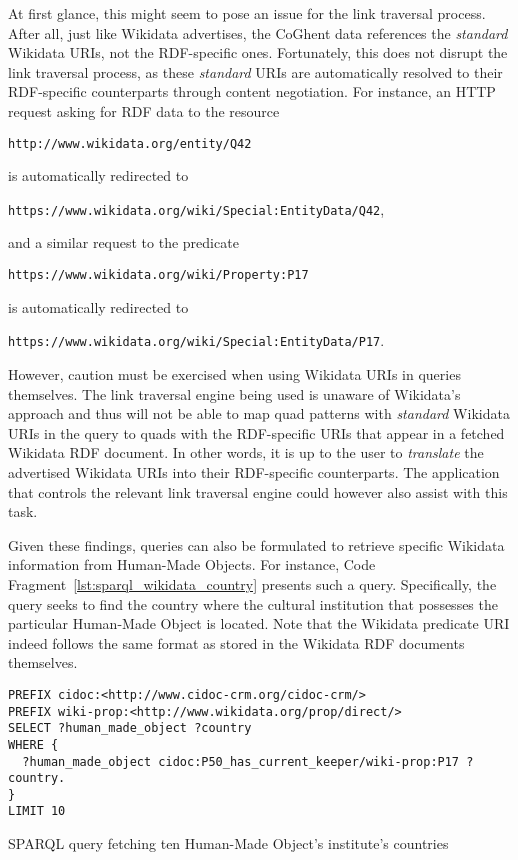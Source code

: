 At first glance, this might seem to pose an issue for the link traversal process. After all, just like Wikidata advertises, the CoGhent data references the \textit{standard} Wikidata URIs, not the RDF-specific ones. Fortunately, this does not disrupt the link traversal process, as these \textit{standard} URIs are automatically resolved to their RDF-specific counterparts through content negotiation. For instance, an HTTP request asking for RDF data to the resource 
\begin{center}
    \texttt{http://www.wikidata.org/entity/Q42}
\end{center}
is automatically redirected to
\begin{center}
    \texttt{https://www.wikidata.org/wiki/Special:EntityData/Q42},
\end{center}
and a similar request to the predicate
\begin{center}
    \texttt{https://www.wikidata.org/wiki/Property:P17}
\end{center}
is automatically redirected to
\begin{center}
    \texttt{https://www.wikidata.org/wiki/Special:EntityData/P17}.
\end{center}

However, caution must be exercised when using Wikidata URIs in queries themselves. The link traversal engine being used is unaware of Wikidata's approach and thus will not be able to map quad patterns with \textit{standard} Wikidata URIs in the query to quads with the RDF-specific URIs that appear in a fetched Wikidata RDF document. In other words, it is up to the user to \textit{translate} the advertised Wikidata URIs into their RDF-specific counterparts. The application that controls the relevant link traversal engine could however also assist with this task.

Given these findings, queries can also be formulated to retrieve specific Wikidata information from Human-Made Objects. For instance, Code Fragment~\ref{lst:sparql_wikidata_country} presents such a query. Specifically, the query seeks to find the country where the cultural institution that possesses the particular Human-Made Object is located. Note that the Wikidata predicate URI indeed follows the same format as stored in the Wikidata RDF documents themselves.

\begin{listing}[htbp]
    \begin{verbatim}
PREFIX cidoc:<http://www.cidoc-crm.org/cidoc-crm/>
PREFIX wiki-prop:<http://www.wikidata.org/prop/direct/>
SELECT ?human_made_object ?country
WHERE {
  ?human_made_object cidoc:P50_has_current_keeper/wiki-prop:P17 ?country.
}
LIMIT 10
    \end{verbatim}
    \caption{SPARQL query fetching ten Human-Made Object's institute's countries}
    \label{lst:sparql_wikidata_country}
\end{listing}

